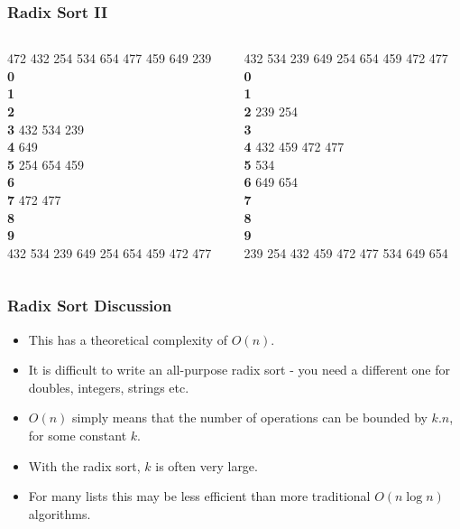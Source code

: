 \begin{frame}[fragile]
\frametitle{Radix Sort II}
\begin{columns}[T]

\begin{column}{0.45\textwidth}
472 432 254 534 654 477 459 649 239\\
\vspace*{1em}
{\bf 0}\\
{\bf 1}\\
{\bf 2}\\
{\bf 3} 432 534 239\\
{\bf 4} 649\\
{\bf 5} 254 654 459\\
{\bf 6}\\
{\bf 7} 472 477\\
{\bf 8}\\
{\bf 9}\\
\vspace*{1em}
432 534 239 649 254 654 459 472 477
\end{column}

\pause
\begin{column}{0.45\textwidth}
432 534 239 649 254 654 459 472 477\\
\vspace*{1em}
{\bf 0}\\
{\bf 1}\\
{\bf 2} 239 254\\
{\bf 3}\\
{\bf 4} 432 459 472 477\\
{\bf 5} 534\\
{\bf 6} 649 654\\
{\bf 7}\\
{\bf 8}\\
{\bf 9}\\
\vspace*{1em}
239 254 432 459 472 477 534 649 654
\end{column}

\end{columns}
\end{frame}


\begin{frame}[fragile]
\frametitle{Radix Sort Discussion}

\begin{itemize}[<+->]
\item This has a theoretical complexity of $O(n)$.
\item It is difficult to write an all-purpose radix sort - you need a different one for doubles, integers, strings etc.
\item $O(n)$ simply means that the number of operations can be bounded by $k.n$, for some constant $k$.
\item With the radix sort, $k$ is often very large.
\item For many lists this may be less efficient than more traditional $O(n \log n)$ algorithms.
\end{itemize}

\end{frame}

